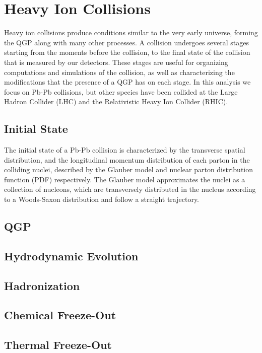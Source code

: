 \section{Heavy Ion Collisions}

Heavy ion collisions produce conditions similar to the very early universe, forming the QGP along with many other processes. A collision undergoes several stages starting from the moments before the collision, to the final state of the collision that is measured by our detectors. These stages are useful for organizing computations and simulations of the collision, as well as characterizing the modifications that the presence of a QGP has on each stage. In this analysis we focus on Pb-Pb collisions, but other species have been collided at the Large Hadron Collider (LHC) and the Relativistic Heavy Ion Collider (RHIC).

\subsection*{Initial State}

The initial state of a Pb-Pb collision is characterized by the transverse spatial distribution, and the longitudinal momentum distribution of each parton in the colliding nuclei, described by the Glauber model and nuclear parton distribution function (PDF) respectively. The Glauber model approximates the nuclei as a collection of nucleons, which are transversely distributed in the nucleus according to a Woods-Saxon distribution and follow a straight trajectory. 

\subsection*{QGP}

\subsection*{Hydrodynamic Evolution}

\subsection*{Hadronization}

\subsection*{Chemical Freeze-Out}

\subsection*{Thermal Freeze-Out}

